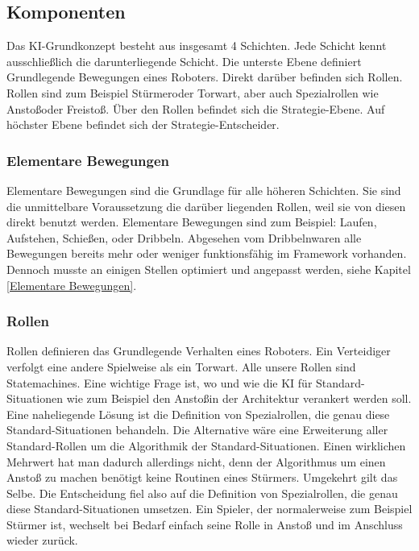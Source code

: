 \documentclass[fontsize=12pt,a4paper,final]{scrartcl}[2003/01/01]
\begin{document}
\subsection{Komponenten}
Das KI-Grundkonzept besteht aus insgesamt 4 Schichten. Jede Schicht kennt ausschließlich die darunterliegende Schicht. Die unterste Ebene definiert Grundlegende Bewegungen eines Roboters. Direkt darüber befinden sich Rollen. Rollen sind zum Beispiel \glqq Stürmer\grqq oder \glqq Torwart\grqq, aber auch Spezialrollen wie \glqq Anstoß\grqq oder \glqq Freistoß\grqq. Über den Rollen befindet sich die Strategie-Ebene. Auf höchster Ebene befindet sich der Strategie-Entscheider.

\subsubsection{Elementare Bewegungen}
Elementare Bewegungen sind die Grundlage für alle höheren Schichten. Sie sind die unmittelbare Voraussetzung die darüber liegenden Rollen, weil sie von diesen direkt benutzt werden. Elementare Bewegungen sind zum Beispiel: \glqq Laufen\grqq, \glqq Aufstehen\grqq, \glqq Schießen\grqq, oder \glqq Dribbeln\grqq. Abgesehen vom \glqq Dribbeln\grqq waren alle Bewegungen bereits mehr oder weniger funktionsfähig im Framework vorhanden. Dennoch musste an einigen Stellen optimiert und angepasst werden, siehe Kapitel \ref{Elementare Bewegungen}.

\subsubsection{Rollen}\label{Rollen Konzept}
Rollen definieren das Grundlegende Verhalten eines Roboters. Ein Verteidiger verfolgt eine andere Spielweise als ein Torwart. Alle unsere Rollen sind Statemachines. Eine wichtige Frage ist, wo und wie die KI für Standard-Situationen wie zum Beispiel den \glqq Anstoß\grqq in der Architektur verankert werden soll. Eine naheliegende Lösung ist die Definition von Spezialrollen, die genau diese Standard-Situationen behandeln. Die Alternative wäre eine Erweiterung aller Standard-Rollen um die Algorithmik der Standard-Situationen. Einen wirklichen Mehrwert hat man dadurch allerdings nicht, denn der Algorithmus um einen Anstoß zu machen benötigt keine Routinen eines Stürmers. Umgekehrt gilt das Selbe. Die Entscheidung fiel also auf die Definition von Spezialrollen, die genau diese Standard-Situationen umsetzen. Ein Spieler, der normalerweise zum Beispiel Stürmer ist, wechselt bei Bedarf einfach seine Rolle in \glqq Anstoß\grqq{} und im Anschluss wieder zurück.
\end{document}
